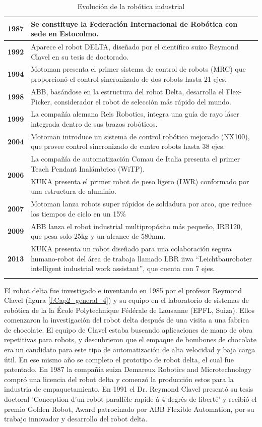 \begin{longtable}[c]{c m{12cm}}
     \textbf{1987} & Se constituye la Federación Internacional de Robótica con sede en Estocolmo. \\ \hline
     \textbf{1992} & Aparece el robot DELTA, diseñado por el científico suizo Reymond Clavel en su tesis de doctorado. \\ \hline
     \textbf{1994} & Motoman presenta el primer sistema de control de robots (MRC) que proporcionó el control sincronizado de dos robots hasta 21 ejes. \\ \hline
     \textbf{1998} & ABB, basándose en la estructura del robot Delta, desarrolla el Flex-Picker, considerador el robot de selección más rápido del mundo. \\ \hline
     \textbf{1999} & La compañía alemana Reis Robotics, integra una guía de rayo láser integrada dentro de sus brazos robóticos. \\ \hline
     \textbf{2004} & Motoman introduce un sistema de control robótico mejorado (NX100), que provee control sincronizado de cuatro robots hasta 38 ejes. \\ \hline
     \multirow{2}{*}{\textbf{2006}} & La compañía de automatización Comau de Italia presenta el primer Teach Pendant Inalámbrico (WiTP). \\ \cline{2-2}
        & KUKA presenta el primer robot de peso ligero (LWR) conformado por una estructura de aluminio. \\ \hline
     \textbf{2007} & Motoman lanza robots super rápidos de soldadura por arco, que reduce los tiempos de ciclo en un 15\% 
     \\ \hline
     \textbf{2009} &  ABB lanza el robot industrial multipropósito más pequeño, IRB120, que pesa solo 25kg y un alcance de 580mm. \\ \hline
     \textbf{2013} & KUKA presenta un robot diseñado para una colaboración segura humano-robot del área de trabaja llamado LBR iiwa “Leichtbauroboter intelligent industrial work assistant”, que cuenta con 7 ejes. \\ \hline
    \caption{Evolución de la robótica industrial}
 \end{longtable}
 
    El robot delta fue investigado e inventando en 1985 por el profesor Reymond Clavel (figura \eqref{f:Cap2_general_4}) y su equipo en el laboratorio de sistemas de robótica de la la École Polytechnique Fédérale de Lausanne (EPFL, Suiza). Ellos comenzaron la investigación del robot delta después de una visita a una fabrica de chocolate. El equipo de Clavel estaba buscando aplicaciones de mano de obra repetitivas para robots, y descubrieron que el empaque de bombones de chocolate era un candidato para este tipo de automatización de alta velocidad y baja carga útil. En ese mismo año se completo el prototipo de robot delta, el cual fue patentado. En 1987 la compañía suiza Demareux Robotics and Microtechnology compró una licencia del robot delta y comenzó la producción estos para la industria de empaquetamiento. En 1991 el Dr. Reymond Clavel presentó su tesis doctoral 'Conception d'un robot parallèle rapide à 4 degrés de liberté' y recibió el premio Golden Robot, Award patrocinado por ABB Flexible Automation, por su trabajo innovador y desarrollo del robot delta.


